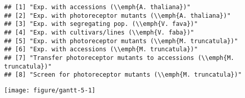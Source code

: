 \begin{knitrout}
\begin{kframe}
\begin{alltt}
 \hlkwb{<-}   \hlstd{=} \hlstd{(}\hlstd{,} \hlstd{))}
\hlopt{$}
\end{alltt}
\begin{verbatim}
## [1] "Exp. with accessions (\\emph{A. thaliana})"                          
## [2] "Exp. with photoreceptor mutants (\\emph{A. thaliana})"               
## [3] "Exp. with segregating pop. (\\emph{V. fava})"                        
## [4] "Exp. with cultivars/lines (\\emph{V. faba})"                         
## [5] "Exp. with photoreceptor mutants (\\emph{M. truncatula})"             
## [6] "Exp. with accessions (\\emph{M. truncatula})"                        
## [7] "Transfer photoreceptor mutants to accessions (\\emph{M. truncatula})"
## [8] "Screen for photoreceptor mutants (\\emph{M. truncatula})"
\end{verbatim}
\end{kframe}
\end{knitrout}

\begin{knitrout}
\color{fgcolor}\begin{kframe}
\begin{alltt}
 \hlkwb{<-}   \hlopt{+}
  \hlstd{(}\hlstd{(}   \hlstd{=} \hlstd{)} \hlopt{+}
  \hlstd{(}\hlstd{)} \hlopt{+}
  \hlstd{(}\hlstd{)} \hlopt{+}
  \hlstd{()} \hlopt{+}
  \hlstd{(} \hlstd{=} \hlstd{(}\hlstd{,} \hlstd{))}
\end{alltt}
\end{kframe}
\end{knitrout}

\begin{knitrout}
\color{fgcolor}\begin{kframe}
\begin{alltt}
\end{alltt}
\end{kframe}
\texttt{[image: figure/gantt-5-1]} 
\begin{kframe}\begin{alltt}
\end{alltt}
\end{kframe}
\end{knitrout}

